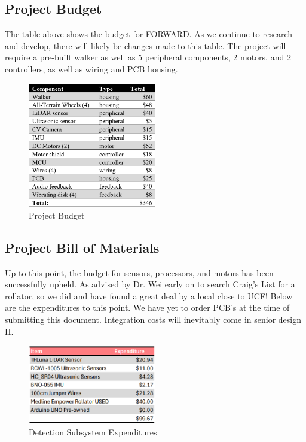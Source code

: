 \subsection{Project Budget} \label{sec:budget}
\noindent The table above shows the budget for FORWARD. As we continue to research and develop, there will likely be changes made to this table. The project will require a pre-built walker as well as 5 peripheral components, 2 motors, and 2 controllers, as well as wiring and PCB housing. \\

\begin{figure}[H]
	\centering
	\includegraphics[width=0.5\textwidth]{./Images/Budget.png}
	\caption{\label{fig:Budget}Project Budget}
\end{figure}

\subsection{Project Bill of Materials} \label{sec:BOM}
\noindent Up to this point, the budget for sensors, processors, and motors has been successfully upheld. As advised by Dr. Wei early on to search Craig's List for a rollator, so we did and have found a great deal by a local close to UCF! Below are the expenditures to this point. We have yet to order PCB's at the time of submitting this document. Integration costs will inevitably come in senior design II.

\begin{figure}[H]
	\centering
	\includegraphics[width=0.5\textwidth]{./Images/detect-bom.png}
	\caption{\label{fig:detect-bom}Detection Subsystem Expenditures}
\end{figure}

